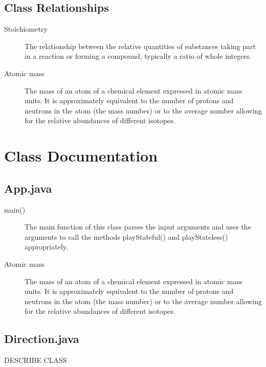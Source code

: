 \documentclass{article}
\begin{document}
\subsection{Class Relationships}
\label{Class Relationships}
\begin{description}
\item[Stoichiometry]
The relationship between the relative quantities of substances taking part in a reaction or forming a compound, typically a ratio of whole integers.
\item[Atomic mass]
The mass of an atom of a chemical element expressed in atomic mass units. It is approximately equivalent to the number of protons and neutrons in the atom (the mass number) or to the average number allowing for the relative abundances of different isotopes. 
\end{description} 
 
 \pagebreak

\section{Class Documentation}

\subsection{App.java}
\label{definitions}
\begin{description}
\item[main()]
The main function of this class parses the input arguments and uses the arguments to call the methods playStateful() and playStateless() appropriately.
\item[Atomic mass]
The mass of an atom of a chemical element expressed in atomic mass units. It is approximately equivalent to the number of protons and neutrons in the atom (the mass number) or to the average number allowing for the relative abundances of different isotopes. 
\end{description} 

\subsection{Direction.java}
\label{Direction.java}
\begin{description}
DESCRIBE CLASS
\end{description} 
\end{document}
